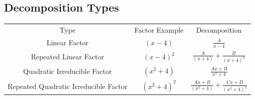 \documentclass[12pt, letterpaper]{article}
\begin{document}
\subsection{Decomposition Types}
\begin{center}
\begin{tabular}{c c c}
Type & Factor Example & Decomposition\\
Linear Factor & $(x-4)$ & $\frac{A}{x-4}$\\
Repeated Linear Factor & $(x-4)^2$ & $\frac{A}{(x+4)} + \frac{B}{(x+4)^2}$\\
Quadratic Irreducible Factor & $(x^2+4)$ & $\frac{Ax+B}{x^2+4}$\\
Repeated Quadratic Irreducible Factor & $(x^2+4)^2$ & $\frac{Ax+B}{(x^2+4)} + \frac{Cx+D}{(x^2+4)^2}$
\end{tabular}
\end{center}
\end{document}
